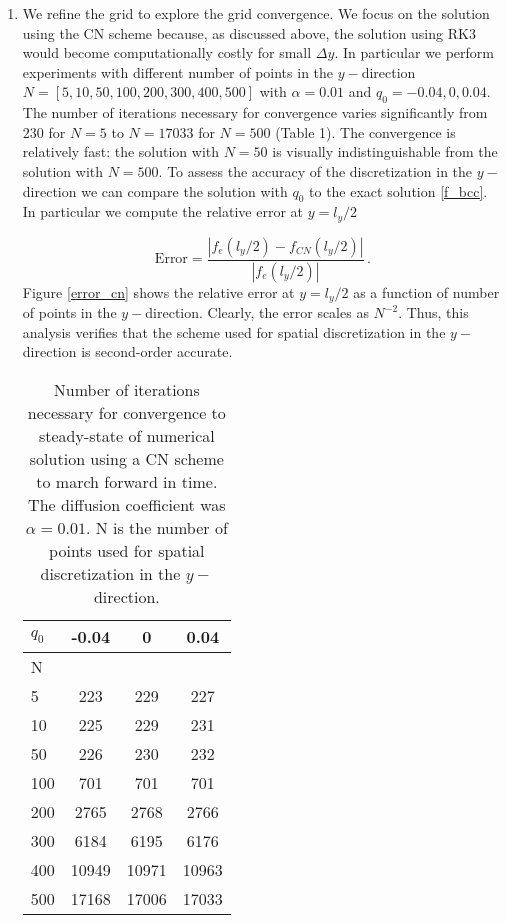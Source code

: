 \documentclass[11pt]{article}
\newcommand{\per}{\, .}
\def\beq{\begin{equation}}
\def\eeq{\end{equation}}
\begin{document}
\begin{enumerate}[label=(\alph*)]
    \item We refine the grid to explore the grid convergence. We focus on the solution using the CN scheme because, as discussed above, the solution using RK3 would become computationally costly for small $\Delta y$. In particular we perform experiments with different number of points in the $y-$direction $N = [5,10,50,100,200,300,400,500]$ with $\alpha = 0.01$ and $q_0=-0.04,0,0.04$.  The number of iterations necessary for convergence varies significantly from $230$ for $N=5$ to $N=17033$ for $N=500$ (Table 1).  The convergence is relatively fast: the solution with $N=50$ is visually indistinguishable from the solution with $N=500$. To assess the accuracy of  the discretization in the $y-$direction we can compare the solution with $q_0$ to the exact solution \eqref{f_bcc}. In particular we compute the relative error at $y=l_y/2$

        \beq
            \text{Error} = \frac{|f_{e}(l_y/2)-f_{CN}(l_y/2)|}{|f_{e}(l_y/2)|}\per
        \eeq
        Figure \ref{error_cn} shows the relative error at $y=l_y/2$ as a function of number of points in the $y-$direction. Clearly, the error scales as $N^{-2}$. Thus, this analysis verifies that the scheme used for spatial discretization in the $y-$direction is second-order accurate.


    \begin{table}\label{iterations_conv}    
        \begin{center}
        \caption{Number of iterations necessary for convergence to steady-state of numerical solution using a CN scheme to march forward in time. The diffusion coefficient was $\alpha=0.01$. N is the number of points used for spatial discretization in the $y-$direction.}
        \begin{tabular}{ l |  c c c }\\
            $q_0$ & -0.04 & 0 & 0.04\\ \hline
            N & & & \\
             5 & 223 & 229 & 227\\
             10 & 225 & 229 & 231\\
             50 & 226 & 230 & 232\\
             100 & 701 & 701 & 701\\
             200 & 2765 & 2768 & 2766\\
             300 & 6184 & 6195 & 6176\\
             400 & 10949 & 10971 & 10963\\
             500 & 17168& 17006 & 17033 \\
        \end{tabular}
    \end{center}
        \end{table}



\end{enumerate}
\end{document}

